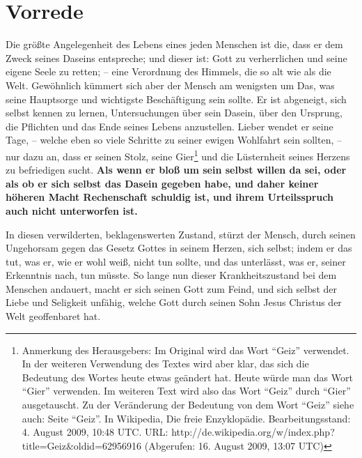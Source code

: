 \chapter{Vorrede}

Die größte Angelegenheit des Lebens eines jeden Menschen ist die, dass er dem
Zweck seines Daseins entspreche; und dieser ist: Gott zu verherrlichen und seine
eigene Seele zu retten; -- eine Verordnung des Himmels, die so alt wie als die
Welt. Gewöhnlich kümmert sich aber der Mensch am wenigsten um Das, was seine
Hauptsorge und wichtigste Beschäftigung sein sollte. Er ist abgeneigt, sich
selbst kennen zu lernen, Untersuchungen über sein Dasein, über den Ursprung, die
Pflichten und das Ende seines Lebens anzustellen. Lieber wendet er seine Tage,
-- welche eben so viele Schritte zu seiner ewigen Wohlfahrt sein sollten, -- nur
dazu an, dass er seinen Stolz, seine Gier\footnote{Anmerkung des Herausgebers:
Im Original wird das Wort "`Geiz"' verwendet. In der weiteren Verwendung des
Textes wird aber klar, das sich die Bedeutung des Wortes heute etwas geändert
hat. Heute würde man das Wort "`Gier"' verwenden. Im weiteren Text wird also das
Wort "`Geiz"' durch "`Gier"' ausgetauscht. Zu der Veränderung der Bedeutung von
dem Wort "`Geiz"' siehe auch: Seite "`Geiz"'. In Wikipedia, Die freie
Enzyklopädie. Bearbeitungsstand: 4. August 2009, 10:48 UTC. URL:
http://de.wikipedia.org/w/index.php?title=Geiz\&oldid=62956916 (Abgerufen: 16.
August 2009, 13:07 UTC) } und die Lüsternheit seines Herzens zu befriedigen
sucht. \textbf{Als wenn er bloß um sein selbst willen da sei, oder als ob er
sich selbst das Dasein gegeben habe, und daher keiner höheren Macht Rechenschaft
schuldig ist, und ihrem Urteilsspruch auch nicht unterworfen ist.}

\medskip

In diesen verwilderten, beklagenswerten Zustand, stürzt der Mensch, durch seinen
Ungehorsam gegen das Gesetz Gottes in seinem Herzen, sich selbst; indem er das
tut, was er, wie er wohl weiß, nicht tun sollte, und das unterlässt, was er,
seiner Erkenntnis nach, tun müsste. So lange nun dieser Krankheitszustand bei
dem Menschen andauert, macht er sich seinen Gott zum Feind, und sich selbst der
Liebe und Seligkeit unfähig, welche Gott durch seinen Sohn Jesus Christus der
Welt geoffenbaret hat.

\medskip

